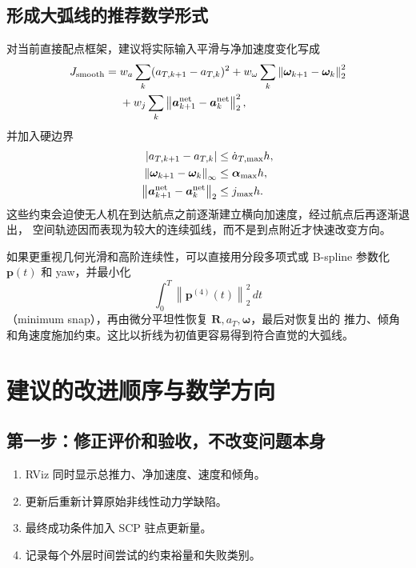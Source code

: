 \documentclass[UTF8,a4paper,11pt]{ctexart}
\newcommand{\normtwo}[1]{\left\lVert#1\right\rVert_2}
\newcommand{\norminf}[1]{\left\lVert#1\right\rVert_\infty}
\begin{document}
\subsection{形成大弧线的推荐数学形式}

对当前直接配点框架，建议将实际输入平滑与净加速度变化写成
\begin{align}
 J_{\rm smooth}={}&w_a\sum_k(a_{T,k+1}-a_{T,k})^2
 +w_\omega\sum_k\normtwo{\bm\omega_{k+1}-\bm\omega_k}^2\nonumber\\
 &+w_j\sum_k\normtwo{
 \bm a_{k+1}^{\rm net}-\bm a_k^{\rm net}}^2,
\end{align}
并加入硬边界
\begin{align}
 |a_{T,k+1}-a_{T,k}|&\leq\dot a_{T,\max}h,\\
 \norminf{\bm\omega_{k+1}-\bm\omega_k}&\leq\bm\alpha_{\max}h,\\
 \normtwo{\bm a_{k+1}^{\rm net}-\bm a_k^{\rm net}}&\leq j_{\max}h.
\end{align}
这些约束会迫使无人机在到达航点之前逐渐建立横向加速度，经过航点后再逐渐退出，
空间轨迹因而表现为较大的连续弧线，而不是到点附近才快速改变方向。

如果更重视几何光滑和高阶连续性，可以直接用分段多项式或 B-spline 参数化
$\bm p(t)$ 和 yaw，并最小化
\begin{equation}
 \int_0^T\normtwo{\bm p^{(4)}(t)}^2\,dt
\end{equation}
（minimum snap），再由微分平坦性恢复 $\bm R,a_T,\bm\omega$，最后对恢复出的
推力、倾角和角速度施加约束。这比以折线为初值更容易得到符合直觉的大弧线。

\section{建议的改进顺序与数学方向}

\subsection{第一步：修正评价和验收，不改变问题本身}

\begin{enumerate}
  \item RViz 同时显示总推力、净加速度、速度和倾角。
  \item 更新后重新计算原始非线性动力学缺陷。
  \item 最终成功条件加入 SCP 驻点更新量。
  \item 记录每个外层时间尝试的约束裕量和失败类别。
\end{enumerate}
\end{document}
